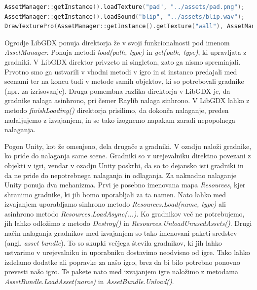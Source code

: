 \documentclass[12pt,a4paper,twoside]{book}
\begin{document}
\begin{lstlisting}[label=code:assetManager, language=C++, caption=Uporaba direktorja virov]
AssetManager::getInstance().loadTexture("pad", "../assets/pad.png");
AssetManager::getInstance().loadSound("blip", "../assets/blip.wav");
DrawTexturePro(AssetManager::getInstance().getTexture("wall"), AssetManager::getInstance().getRectangle("wall"), renderRectangle, Vector2{0, 0}, 0, BLUE);
\end{lstlisting}

Ogrodje LibGDX ponuja direktorja že v svoji funkcionalnosti pod imenom \textit{AssetManager}. Ponuja metodi \textit{load(path, type)} in \textit{get(path, type)}, ki upravljata z gradniki. V LibGDX direktor privzeto ni singleton, zato ga nismo spreminjali. Prvotno smo ga ustvarili v vhodni metodi v igro in si instanco predajali med scenami ter na koncu tudi v metode samih objektov, ki so potrebovali gradnike (npr. za izrisovanje). Druga pomembna razlika direktorja v LibGDX je, da gradnike nalaga asinhrono, pri čemer Raylib nalaga sinhrono. V LibGDX lahko z metodo \textit{finishLoading()} direktorja prisilimo, da dokonča nalaganje, preden nadaljujemo z izvajanjem, in se tako izognemo napakam zaradi nepopolnega nalaganja.

Pogon Unity, kot že omenjeno, dela drugače z gradniki. V ozadju naloži gradnike, ko pride do nalaganja same scene. Gradniki so v urejevalniku direktno povezani z objekti v igri, vendar v ozadju Unity poskrbi, da so to dejansko isti gradniki in da ne pride do nepotrebnega nalaganja in odlaganja. Za naknadno nalaganje Unity ponuja dva mehanizma. Prvi je posebno imenovana mapa \textit{Resources}, kjer shranimo gradnike, ki jih bomo uporabljali za ta namen. Nato lahko med izvajanjem uporabljamo sinhrono metodo \textit{Resources.Load(name, type)} ali asinhrono metodo \textit{Resources.LoadAsync(...)}. Ko gradnikov več ne potrebujemo, jih lahko odložimo z metodo \textit{Destroy()} in \textit{Resources.UnloadUnusedAssets()}. Drugi način nalaganja gradnikov med izvajanjem so tako imenovani paketi sredstev (angl. \textit{asset bundle}). To so skupki večjega števila gradnikov, ki jih lahko ustvarimo v urejevalniku in uporabniku dostavimo neodvisno od igre. Tako lahko izdelamo dodatke ali popravke za našo igro, brez da bi bilo potrebno ponovno prevesti našo igro. Te pakete nato med izvajanjem igre naložimo z metodama \textit{AssetBundle.LoadAsset(name)} in \textit{AssetBundle.Unload()}. 
\end{document}

